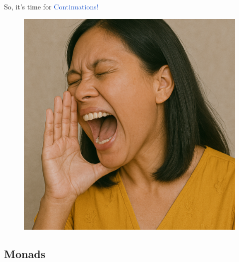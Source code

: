 \begin{frame}
\begin{minipage}[t]{.41\textwidth}
		\centering
		\large
		So, it's time
		for
		\LARGE
		\textcolor{highlight}{\boldslant Continuations!}
	\end{minipage}
	\begin{minipage}[t]{.30\textwidth}
		\begin{figure}[h]
			\centering
			\sloppy
			\includegraphics[height=.38\textheight]{img/woman-shouting.png}
		\end{figure}
	\end{minipage}
\end{frame}

\subsection{Monads}


